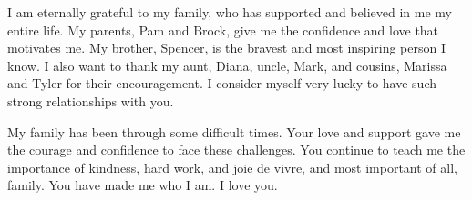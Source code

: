 I am eternally grateful to my family, who has supported and believed in me my entire life.  My parents, Pam and Brock, give me the
confidence
and love that motivates me.  My brother, Spencer, is the bravest and most inspiring person I know.  I also want to thank my aunt, Diana,
uncle, Mark, and cousins, Marissa and Tyler for their encouragement.  I consider myself very lucky to have such strong relationships with
you.

My family has been through some difficult times.  Your love and support gave me the courage and confidence to face these
challenges.  You continue to teach me the importance of kindness, hard work,
and joie de vivre, and most important of all, family.  You have made me who I am.  I love you.
